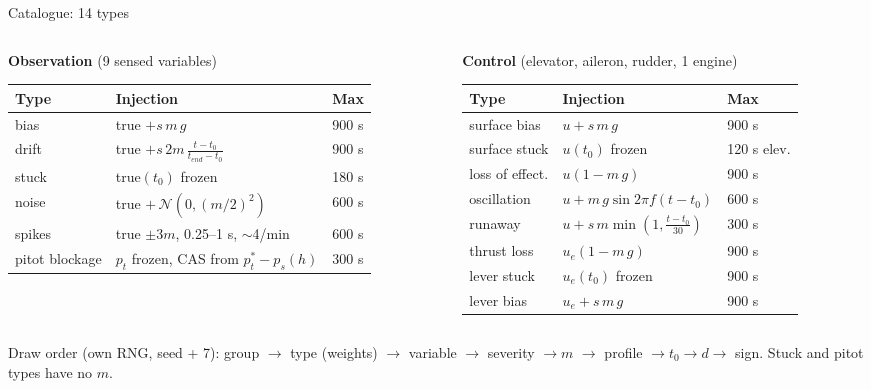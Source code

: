 \documentclass[aspectratio=169,11pt]{beamer}
\newcommand{\obs}[1]{{\color{flight}\textbf{#1}}}
\newcommand{\ctl}[1]{{\color{twin}\textbf{#1}}}
\begin{document}
\begin{frame}{Catalogue: 14 types}
  \scriptsize
  \begin{columns}[T]
    \begin{column}{0.49\textwidth}
      \obs{Observation} (9 sensed variables)\\[0.3em]
      \begin{tabularx}{\linewidth}{@{}l L l@{}}
        \toprule
        Type & Injection & Max \\
        \midrule
        bias & true $+ s\,m\,g$ & 900 s \\
        drift & true $+ s\,2m\,\frac{t-t_0}{t_{end}-t_0}$ & 900 s \\
        stuck & true$(t_0)$ frozen & 180 s \\
        noise & true $+\,\mathcal N(0,(m/2)^2)$ & 600 s \\
        spikes & true $\pm 3m$, 0.25--1 s, $\sim$4/min & 600 s \\
        pitot blockage & $p_t$ frozen, CAS from $p_t^*-p_s(h)$ & 300 s \\
        \bottomrule
      \end{tabularx}
    \end{column}
    \begin{column}{0.49\textwidth}
      \ctl{Control} (elevator, aileron, rudder, 1 engine)\\[0.3em]
      \begin{tabularx}{\linewidth}{@{}l L l@{}}
        \toprule
        Type & Injection & Max \\
        \midrule
        surface bias & $u + s\,m\,g$ & 900 s \\
        surface stuck & $u(t_0)$ frozen & 120 s elev. \\
        loss of effect. & $u(1 - m\,g)$ & 900 s \\
        oscillation & $u + m\,g\sin 2\pi f(t-t_0)$ & 600 s \\
        runaway & $u + s\,m\min(1,\frac{t-t_0}{30})$ & 300 s \\
        thrust loss & $u_e(1 - m\,g)$ & 900 s \\
        lever stuck & $u_e(t_0)$ frozen & 900 s \\
        lever bias & $u_e + s\,m\,g$ & 900 s \\
        \bottomrule
      \end{tabularx}
    \end{column}
  \end{columns}
  \vspace{0.8em}

  \small Draw order (own RNG, seed + 7): group $\rightarrow$ type (weights) $\rightarrow$ variable $\rightarrow$ severity $\rightarrow m$ $\rightarrow$ profile $\rightarrow t_0 \rightarrow d \rightarrow$ sign.
  Stuck and pitot types have no $m$.
\end{frame}
\end{document}
